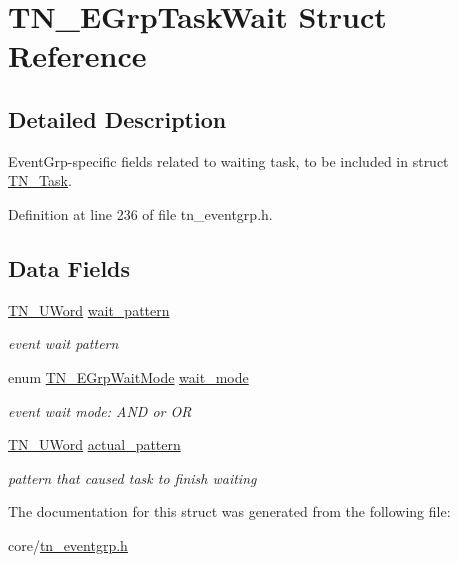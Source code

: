 \hypertarget{structTN__EGrpTaskWait}{\section{T\+N\+\_\+\+E\+Grp\+Task\+Wait Struct Reference}
\label{structTN__EGrpTaskWait}
}


\subsection{Detailed Description}
Event\+Grp-\/specific fields related to waiting task, to be included in struct \hyperlink{structTN__Task}{T\+N\+\_\+\+Task}. 

Definition at line 236 of file tn\+\_\+eventgrp.\+h.

\subsection*{Data Fields}
\begin{DoxyCompactItemize}
\item 
\hypertarget{structTN__EGrpTaskWait_a9e35b117bbf6c8ed435bf08b7ca875b3}{\hyperlink{tn__arch__example_8h_ab80cba0fe9ffcd9011d53dfeb9e39bf4}{T\+N\+\_\+\+U\+Word} \hyperlink{structTN__EGrpTaskWait_a9e35b117bbf6c8ed435bf08b7ca875b3}{wait\+\_\+pattern}}\label{structTN__EGrpTaskWait_a9e35b117bbf6c8ed435bf08b7ca875b3}

\begin{DoxyCompactList}\small\item\em event wait pattern \end{DoxyCompactList}\item 
\hypertarget{structTN__EGrpTaskWait_a0f62cf02ae71ab6a79b01f28f48854f8}{enum \hyperlink{tn__eventgrp_8h_a9d42ee61ae8da342f1cd6440b7e54bbd}{T\+N\+\_\+\+E\+Grp\+Wait\+Mode} \hyperlink{structTN__EGrpTaskWait_a0f62cf02ae71ab6a79b01f28f48854f8}{wait\+\_\+mode}}\label{structTN__EGrpTaskWait_a0f62cf02ae71ab6a79b01f28f48854f8}

\begin{DoxyCompactList}\small\item\em event wait mode\+: {\ttfamily A\+N\+D} or {\ttfamily O\+R} \end{DoxyCompactList}\item 
\hypertarget{structTN__EGrpTaskWait_ab0dd157cd06693b45a73a4b82ad713e8}{\hyperlink{tn__arch__example_8h_ab80cba0fe9ffcd9011d53dfeb9e39bf4}{T\+N\+\_\+\+U\+Word} \hyperlink{structTN__EGrpTaskWait_ab0dd157cd06693b45a73a4b82ad713e8}{actual\+\_\+pattern}}\label{structTN__EGrpTaskWait_ab0dd157cd06693b45a73a4b82ad713e8}

\begin{DoxyCompactList}\small\item\em pattern that caused task to finish waiting \end{DoxyCompactList}\end{DoxyCompactItemize}


The documentation for this struct was generated from the following file\+:\begin{DoxyCompactItemize}
\item 
core/\hyperlink{tn__eventgrp_8h}{tn\+\_\+eventgrp.\+h}\end{DoxyCompactItemize}
